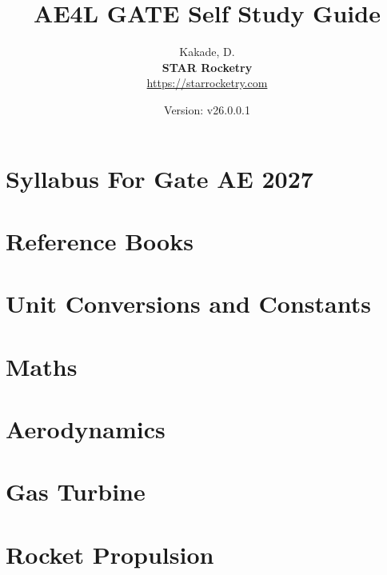 \documentclass{book}
\title{AE4L GATE Self Study Guide}
\author{
  Kakade, D. \\[10cm]
  \small\textbf{STAR Rocketry}\\
  \small\url{https://starrocketry.com}\\
}
\date{\vspace{1cm}\small Version: v26.0.0.1}
\begin{document}
\begin{titlepage}
  \maketitle
\end{titlepage}


\clearpage
\tableofcontents
\listoftables
\listoffigures
\clearpage

\chapter{Syllabus For Gate AE 2027}



\chapter{Reference Books}



\chapter{Unit Conversions and Constants}



\chapter{Maths}



\chapter{Aerodynamics}



\chapter{Gas Turbine}



\chapter{Rocket Propulsion}
\end{document}
